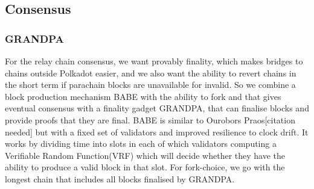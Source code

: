 \subsection{Consensus}






\subsubsection{GRANDPA} \label{sec:grandpa}

For the relay chain consensus, we want provably finality, which makes bridges to chains outside Polkadot easier, and we also want the ability to revert chains in the short term if parachain blocks are unavailable for invalid.
So we combine a block production mechanism BABE with the ability to fork and that gives eventual consensus with a finality gadget GRANDPA, that can finalise blocks and provide proofs that they are final.
BABE is similar to Ourobors Praos[citation needed] but with a fixed set of validators and improved resilience to clock drift.
It works by dividing time into slots in each of which validators computing a Verifiable Random Function(VRF) which will decide whether they have the ability to produce a valid block in that slot.
For fork-choice, we go with the longest chain that includes all blocks finalised by GRANDPA.

